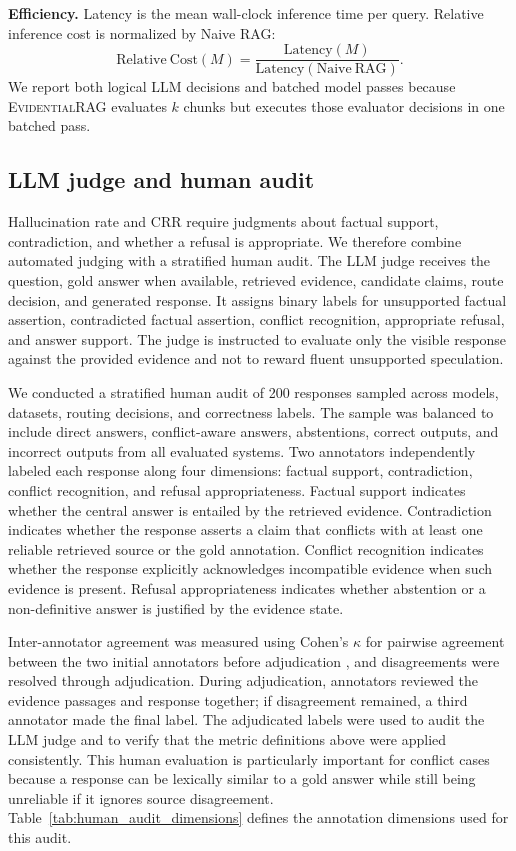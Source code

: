 \documentclass[preprint,12pt,authoryear,nopreprintline]{elsarticle}
\newcommand{\ERAG}{\textsc{EvidentialRAG}}
\begin{document}
\textbf{Efficiency.} Latency is the mean wall-clock inference time per query. Relative inference cost is normalized by Naive RAG:
\begin{equation}
    \mathrm{Relative\ Cost}(M)=\frac{\mathrm{Latency}(M)}{\mathrm{Latency}(\mathrm{Naive\ RAG})}.
\end{equation}
We report both logical LLM decisions and batched model passes because \ERAG{} evaluates $k$ chunks but executes those evaluator decisions in one batched pass.

\subsection{LLM judge and human audit}
\label{sec:human_eval}

Hallucination rate and CRR require judgments about factual support, contradiction, and whether a refusal is appropriate. We therefore combine automated judging with a stratified human audit. The LLM judge receives the question, gold answer when available, retrieved evidence, candidate claims, route decision, and generated response. It assigns binary labels for unsupported factual assertion, contradicted factual assertion, conflict recognition, appropriate refusal, and answer support. The judge is instructed to evaluate only the visible response against the provided evidence and not to reward fluent unsupported speculation.

We conducted a stratified human audit of 200 responses sampled across models, datasets, routing decisions, and correctness labels. The sample was balanced to include direct answers, conflict-aware answers, abstentions, correct outputs, and incorrect outputs from all evaluated systems. Two annotators independently labeled each response along four dimensions: factual support, contradiction, conflict recognition, and refusal appropriateness. Factual support indicates whether the central answer is entailed by the retrieved evidence. Contradiction indicates whether the response asserts a claim that conflicts with at least one reliable retrieved source or the gold annotation. Conflict recognition indicates whether the response explicitly acknowledges incompatible evidence when such evidence is present. Refusal appropriateness indicates whether abstention or a non-definitive answer is justified by the evidence state.

Inter-annotator agreement was measured using Cohen's $\kappa$ for pairwise agreement between the two initial annotators before adjudication \citep{Cohen1960Kappa}, and disagreements were resolved through adjudication. During adjudication, annotators reviewed the evidence passages and response together; if disagreement remained, a third annotator made the final label. The adjudicated labels were used to audit the LLM judge and to verify that the metric definitions above were applied consistently. This human evaluation is particularly important for conflict cases because a response can be lexically similar to a gold answer while still being unreliable if it ignores source disagreement. Table~\ref{tab:human_audit_dimensions} defines the annotation dimensions used for this audit.
\end{document}

